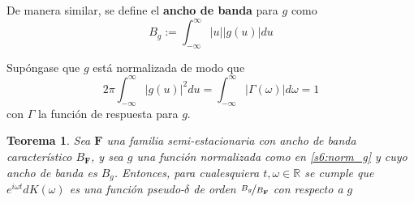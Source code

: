 \documentclass[12pt,letterpaper]{book}
\newtheorem{teorema}{Teorema}[chapter]
\newcommand{\R}{\mathbb{R}}
\newcommand{\intR}{\int_{-\infty}^{\infty}}
\newcommand{\ef}{\mathbf{F}}
\newcommand{\abso}[1]{\left| #1 \right|}
\begin{document}
De manera similar, se define el \textbf{ancho de banda} para $g$ como 
\begin{equation}
B_g := \intR \abso{u} \abso{g(u)} du
\end{equation}

Supóngase que $g$ está normalizada de modo que
\begin{equation}
2 \pi \intR \abso{g(u)}^{2} du = \intR \abso{\Gamma(\omega)} d\omega = 1
\label{s6:norm_g}
\end{equation}
con $\Gamma$ la función de respuesta para $g$.

\begin{teorema}
Sea $\ef$ una familia semi-estacionaria con ancho de banda característico $B_\ef$, y sea $g$ una función normalizada como en \ref{s6:norm_g} y cuyo ancho de banda es $B_g$. Entonces, para cualesquiera $t, \omega \in \R$ se cumple que $e^{i \omega t} dK(\omega)$ es una función pseudo-$\delta$ de orden $\nicefrac{B_g}{B_\ef}$ con respecto a $g$
\label{teo:s6:lema}
\end{teorema}
\end{document}
